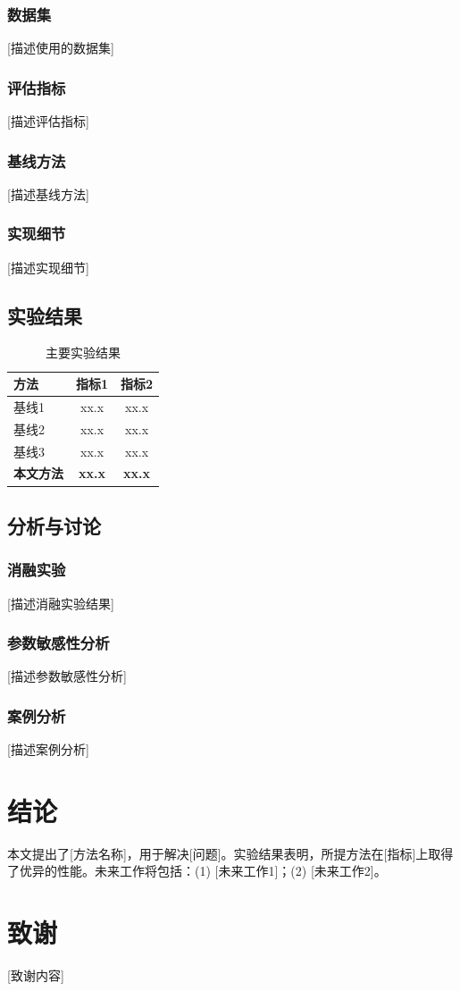 \documentclass[12pt,a4paper]{article}
\begin{document}
\subsubsection{数据集}
[描述使用的数据集]

\subsubsection{评估指标}
[描述评估指标]

\subsubsection{基线方法}
[描述基线方法]

\subsubsection{实现细节}
[描述实现细节]

\subsection{实验结果}

\begin{table}[H]
\centering
\caption{主要实验结果}
\label{tab:main_results}
\begin{tabular}{lcc}
\toprule
方法 & 指标1 & 指标2 \\
\midrule
基线1 & xx.x & xx.x \\
基线2 & xx.x & xx.x \\
基线3 & xx.x & xx.x \\
\textbf{本文方法} & \textbf{xx.x} & \textbf{xx.x} \\
\bottomrule
\end{tabular}
\end{table}

\subsection{分析与讨论}

\subsubsection{消融实验}
[描述消融实验结果]

\subsubsection{参数敏感性分析}
[描述参数敏感性分析]

\subsubsection{案例分析}
[描述案例分析]

\section{结论}
本文提出了[方法名称]，用于解决[问题]。实验结果表明，所提方法在[指标]上取得了优异的性能。未来工作将包括：(1) [未来工作1]；(2) [未来工作2]。

\section*{致谢}
[致谢内容]



\end{document}

